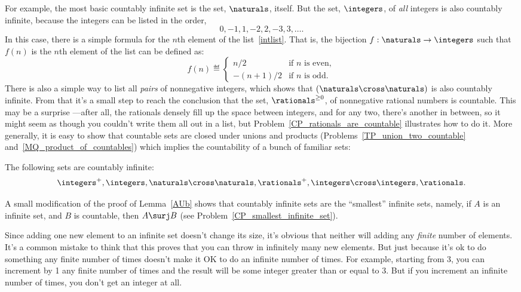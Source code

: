 For example, the most basic countably infinite set is the set,
$\naturals$, itself.  But the set, $\integers$, of \emph{all} integers
is also countably infinite, because the integers can be listed in the
order,
\begin{equation}\label{intlist}
0,-1,1,-2,2,-3,3,\dots.
\end{equation}
In this case, there is a simple formula for the $n$th element of the
list~\eqref{intlist}.  That is, the bijection $f:\naturals \to
\integers$ such that $f(n)$ is the $n$th element of the list can be
defined as:
\[
f(n) \eqdef \begin{cases} n/2 & \text{if $n$ is even},\\ -(n+1)/2 &
  \text{if $n$ is odd}.
           \end{cases} 
\]    
There is also a simple way to list all \emph{pairs} of nonnegative
integers, which shows that $(\naturals \cross \naturals)$ is also
countably infinite.  From that it's a small step to reach the
conclusion that the set, $\rationals^{\ge 0}$, of nonnegative rational
numbers is countable.  This may be a surprise ---after all, the
rationals densely fill up the space between integers, and for any two,
there's another in between, so it might seem as though you couldn't
write them all out in a list, but
Problem~\ref{CP_rationals_are_countable} illustrates how to do it.
More generally, it is easy to show that countable sets are closed
under unions and products (Problems~\ref{TP_union_two_countable}
and~\ref{MQ_product_of_countables}) which implies the countability of
a bunch of familiar sets:
\begin{corollary}\label{countable_examples}
The following sets are countably infinite:
\[\integers^+, 
 \integers, \naturals \cross \naturals, \rationals^+, \integers \cross
 \integers, \rationals.
\]
\end{corollary}

A small modification of the proof of Lemma~\ref{AUb} shows that
countably infinite sets are the ``smallest'' infinite sets, namely, if
$A$ is an infinite set, and $B$ is countable, then $A \surj B$ (see
Problem~\ref{CP_smallest_infinite_set}).

Since adding one new element to an infinite set doesn't change its
size, it's obvious that neither will adding any \emph{finite} number
of elements.  It's a common mistake to think that this proves that you
can throw in infinitely many new elements.  But just because it's ok
to do something any finite number of times doesn't make it OK to do an
infinite number of times.  For example, starting from 3, you can
increment by 1 any finite number of times and the result will be some
integer greater than or equal to 3.  But if you increment an infinite
number of times, you don't get an integer at all.

